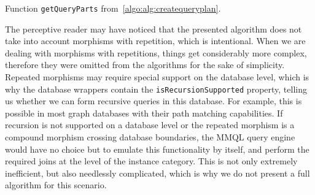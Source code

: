 \begin{algorithm}[ht]
\small
\DontPrintSemicolon
{}


\caption{Function \texttt{getQueryParts} from~\cref{algo:alg:createqueryplan}.}
\label{algo:alg:getqueryparts}
\end{algorithm}

The perceptive reader may have noticed that the presented algorithm does not take into account morphisms with repetition, which is intentional.
When we are dealing with morphisms with repetitions, things get considerably more complex, therefore they were omitted from the algorithms for the sake of simplicity.
Repeated morphisms may require special support on the database level, which is why the database wrappers contain the \texttt{isRecursionSupported} property, telling us whether we can form recursive queries in this database.
For example, this is possible in most graph databases with their path matching capabilities.
If recursion is not supported on a database level or the repeated morphism is a compound morphism crossing database boundaries, the MMQL query engine would have no choice but to emulate this functionality by itself, and perform the required joins at the level of the instance category.
This is not only extremely inefficient, but also needlessly complicated, which is why we do not present a full algorithm for this scenario.

